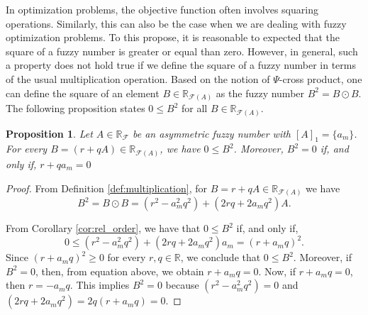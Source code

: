 \documentclass[12pt,a4paper]{article}
\newcommand{\RR}{\mathbb{R}}
\newcommand{\RF}{\mathbb{R}_\mathcal{F}}
\newcommand{\RFA}{\mathbb{R}_{\mathcal{F}(A)}}
\newtheorem{proposition}{Proposition}
\begin{document}
In optimization problems, the objective function often involves squaring operations. 
Similarly, this can also be the case when we are dealing with fuzzy optimization problems. 
To this propose, it is reasonable to expected that the square of a fuzzy number is greater or equal than zero. 
However, in general, such a property does not hold true if we define the square of a fuzzy number in terms of the usual multiplication operation. 
Based on the notion of $\Psi$-cross product, one can define the square of an element $B \in \RFA$ as the fuzzy number $B^2 = B\odot B.$
The following proposition states $0 \leq B^2$ for all $B \in \RFA$.

\begin{proposition}\label{prop:inequality}
Let $A \in \RF$ be an asymmetric fuzzy number with $[A]_1 = \{a_m\}$.
For every $B = (r + qA) \in \RFA$, we have $0 \leq B^2$. 
Moreover, $B^2 = 0$ if, and only if, $r + qa_m = 0$
\end{proposition}
\begin{proof}
From Definition \ref{def:multiplication}, for $B=r + qA \in \RFA$ we have
\begin{equation}\label{eq:B2}
B^2 = B \odot B = (r^2 - a_m^2q^2) + (2rq + 2a_mq^2)A.    
\end{equation}

From Corollary \ref{cor:rel_order}, we have that $0 \leq B^2$ if, and only if, 
$$
0 \leq (r^2 - a_m^2q^2) + (2rq + 2a_mq^2)a_m = (r + a_mq)^2.
$$
Since $(r + a_mq)^2 \geq 0$ for every $r,q\in \RR$, we conclude that $0 \leq B^2.$
Moreover, if $B^2 = 0$, then, from equation above, we obtain $r + a_mq = 0$. Now, if $r + a_mq = 0$, then $r = -a_mq$. 
This implies $B^2 = 0$ because $(r^2 - a_m^2q^2) = 0$ and $(2rq + 2a_mq^2)= 2q(r + a_mq) = 0$. 

%
%
\end{proof}
\end{document}
